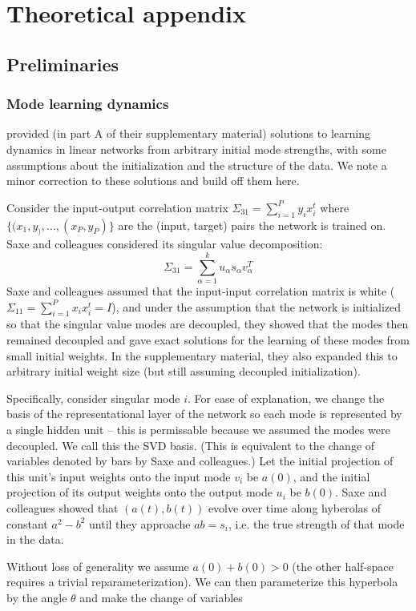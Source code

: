\documentclass{article}
\begin{document}
\section{Theoretical appendix}
\subsection{Preliminaries}
\subsubsection{Mode learning dynamics}
\citet{Saxe2014} provided (in part A of their supplementary material) solutions to learning dynamics in linear networks from arbitrary initial mode strengths, with some assumptions about the initialization and the structure of the data. We note a minor correction to these solutions and build off them here. \par
Consider the input-output correlation matrix $\Sigma_{31} = \sum_{i=1}^P y_ix_i^t$ where $\{(x_1, y_), ..., (x_P, y_P)\}$ are the (input, target) pairs the network is trained on. Saxe and colleagues considered its singular value decomposition:
$$\Sigma_{31} = \sum_{\alpha=1}^{k} u_\alpha s_\alpha v_\alpha^T$$
Saxe and colleagues assumed that the input-input correlation matrix is white ($\Sigma_11 = \sum_{i=1}^P x_i x_i^t = I$), and under the assumption that the network is initialized so that the singular value modes are decoupled, they showed that the modes then remained decoupled and gave exact solutions for the learning of these modes from small initial weights. In the supplementary material, they also expanded this to arbitrary initial weight size (but still assuming decoupled initialization). \par
Specifically, consider singular mode $i$. For ease of explanation, we change the basis of the representational layer of the network so each mode is represented by a single hidden unit -- this is permissable because we assumed the modes were decoupled. We call this the SVD basis. (This is equivalent to the change of variables denoted by bars by Saxe and colleagues.) Let the initial projection of this unit's input weights onto the input mode $v_i$ be $a(0)$, and the initial projection of its output weights onto the output mode $u_i$ be $b(0)$. Saxe and colleagues showed that $(a(t), b(t))$ evolve over time along hyberolas of constant $a^2-b^2$ until they approache $ab = s_i$, i.e. the true strength of that mode in the data. \par
Without loss of generality we assume $a(0) + b(0) > 0$ (the other half-space requires a trivial reparameterization). We can then parameterize this hyperbola by the angle $\theta$ and make the change of variables
\end{document}
